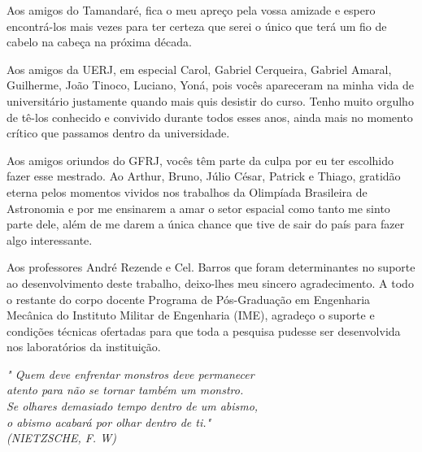 \begin{agradecimentos}
Aos amigos do Tamandaré, fica o meu apreço pela vossa amizade e espero encontrá-los mais vezes para ter certeza que serei o único que terá um fio de cabelo na cabeça na próxima década.

Aos amigos da UERJ, em especial Carol, Gabriel Cerqueira, Gabriel Amaral, Guilherme, João Tinoco, Luciano, Yoná, pois vocês apareceram na minha vida de universitário justamente quando mais quis desistir do curso. Tenho muito orgulho de tê-los conhecido e convivido durante todos esses anos, ainda mais no momento crítico que passamos dentro da universidade.

Aos amigos oriundos do GFRJ, vocês têm parte da culpa por eu ter escolhido fazer esse mestrado. Ao Arthur, Bruno, Júlio César, Patrick e Thiago, gratidão eterna pelos momentos vividos nos trabalhos da Olimpíada Brasileira de Astronomia e por me ensinarem a amar o setor espacial como tanto me sinto parte dele, além de me darem a única chance que tive de sair do país para fazer algo interessante. 

Aos professores André Rezende e Cel. Barros que foram determinantes no suporte ao desenvolvimento deste trabalho, deixo-lhes meu sincero agradecimento. A todo o restante do corpo docente Programa de Pós-Graduação em Engenharia Mecânica do Instituto Militar de Engenharia (IME), agradeço o suporte e condições técnicas ofertadas para que toda a pesquisa pudesse ser desenvolvida nos laboratórios da instituição.

\end{agradecimentos}

\begin{epigrafe}
    \vspace*{\fill}
	\begin{flushright}
		\textit{"
		Quem deve enfrentar monstros deve permanecer\\
		atento para não se tornar também um monstro. \\
		Se olhares demasiado tempo dentro de um abismo, \\
		o abismo acabará por olhar dentro de ti." \\
		(NIETZSCHE, F. W)}
	\end{flushright}
\end{epigrafe}


